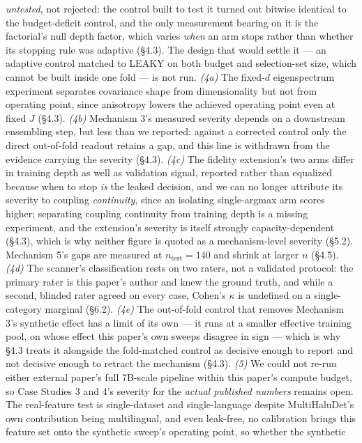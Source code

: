 \documentclass[10pt]{article} %
\begin{document}
\emph{untested}, not rejected: the control built to test it turned out
bitwise identical to the budget-deficit control, and the only measurement
bearing on it is the factorial's null depth factor, which varies \emph{when}
an arm stops rather than whether its stopping rule was adaptive (§4.3). The
design that would settle it --- an adaptive control matched to LEAKY on both
budget and selection-set size, which cannot be built inside one fold --- is
not run.
\emph{(4a)} The fixed-$d$ eigenspectrum experiment separates covariance
shape from dimensionality but not from operating point, since anisotropy
lowers the achieved operating point even at fixed $J$ (§4.3).
\emph{(4b)} Mechanism 3's measured severity depends on a downstream
ensembling step, but less than we reported: against a corrected control only
the direct out-of-fold readout retains a gap, and this line is withdrawn from
the evidence carrying the severity (§4.3).
\emph{(4c)} The fidelity extension's two arms differ in training depth as
well as validation signal, reported rather than equalized because when to
stop \emph{is} the leaked decision, and we can no longer attribute its
severity to coupling \emph{continuity}, since an isolating single-argmax arm
scores higher; separating coupling continuity from training depth is a
missing experiment, and the extension's severity is itself strongly
capacity-dependent (§4.3), which is why neither figure is quoted as a
mechanism-level severity (§5.2). Mechanism 5's gaps are measured at
$n_{\text{test}}=140$ and shrink at larger $n$ (§4.5).
\emph{(4d)} The scanner's classification rests on two raters, not a
validated protocol: the primary rater is this paper's author and knew the
ground truth, and while a second, blinded rater agreed on every case, Cohen's
$\kappa$ is undefined on a single-category marginal (§6.2).
\emph{(4e)} The out-of-fold control that removes Mechanism 3's synthetic
effect has a limit of its own --- it runs at a smaller effective training
pool, on whose effect this paper's own sweeps disagree in sign --- which is
why §4.3 treats it alongside the fold-matched control as decisive enough to
report and not decisive enough to retract the mechanism (§4.3).
\emph{(5)} We could not re-run either external paper's full 7B-scale pipeline
within this paper's compute budget, so Case Studies 3 and 4's severity for
the \emph{actual published numbers} remains open. The real-feature test is
single-dataset and single-language despite MultiHaluDet's own contribution
being multilingual, and even leak-free, no calibration brings this feature
set onto the synthetic sweep's operating point, so whether the synthetic
\end{document}
